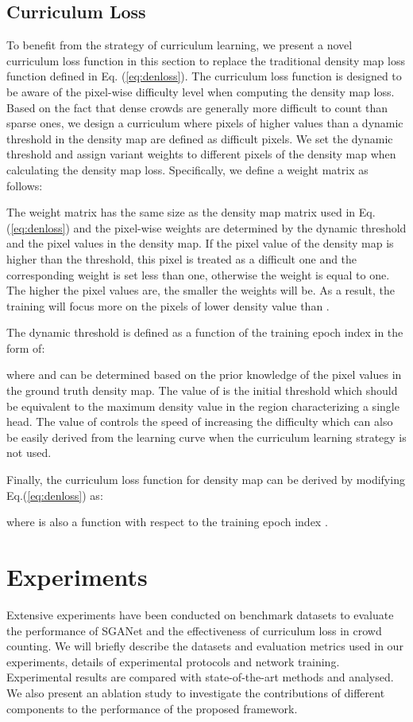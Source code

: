 \documentclass[journal,comsoc]{IEEEtran}
\begin{document}
\subsection{Curriculum Loss} \label{sec:cl}
To benefit from the strategy of curriculum learning, we present a novel curriculum loss function in this section to replace the traditional density map loss function defined in Eq. (\ref{eq:denloss}). The curriculum loss function is designed to be aware of the pixel-wise difficulty level when computing the density map loss. Based on the fact that dense crowds are generally more difficult to count than sparse ones, we design a curriculum where pixels of higher values than a dynamic threshold in the density map are defined as difficult pixels. We set the dynamic threshold and assign variant weights to different pixels of the density map when calculating the density map loss. Specifically, we define a weight matrix  as follows:

The weight matrix  has the same size as the density map matrix  used in Eq.(\ref{eq:denloss}) and the pixel-wise weights are determined by the dynamic threshold  and the pixel values in the density map. 
If the pixel value of the density map is higher than the threshold, this pixel is treated as a difficult one and the corresponding weight is set less than one, otherwise the weight is equal to one. The higher the pixel values are, the smaller the weights will be. As a result, the training will focus more on the pixels of lower density value than .

The dynamic threshold  is defined as a function of the training epoch index in the form of:

where  and  can be determined based on the prior knowledge of the pixel values in the ground truth density map. The value of  is the initial threshold which should be equivalent to the maximum density value in the region characterizing a single head. The value of  controls the speed of increasing the difficulty which can also be easily derived from the learning curve when the curriculum learning strategy is not used.

Finally, the curriculum loss function for density map can be derived by modifying Eq.(\ref{eq:denloss}) as:

where  is also a function with respect to the training epoch index .


\section{Experiments}\label{sec:experiments}
Extensive experiments have been conducted on benchmark datasets to evaluate the performance of SGANet and the effectiveness of curriculum loss in crowd counting. We will briefly describe the datasets and evaluation metrics used in our experiments, details of experimental protocols and network training. Experimental results are compared with state-of-the-art methods and analysed. We also present an ablation study to investigate the contributions of different components to the performance of the proposed framework.
\end{document}
